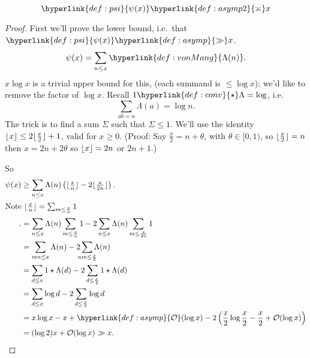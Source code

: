 \documentclass{article}
\newcommand{\1}{\mathbbm{1}}
\newcommand{\bigO}{\mathcal{O}}
\DeclarePairedDelimiter\floor{\lfloor}{\rfloor}
\begin{document}
\begin{nthm}[Chebyshev]\label{thm:6}
  \begin{equation*}
    \hyperlink{def:psi}{\psi(x)} \hyperlink{def:asymp2}{\asymp} x
  \end{equation*}
\end{nthm}
\begin{proof}
  First we'll prove the lower bound, i.e.\ that $\hyperlink{def:psi}{\psi(x)} \hyperlink{def:asymp}{\gg} x$.
  \begin{equation*}
    \psi(x) = \sum_{n \leq x} \hyperlink{def:vonMang}{\Lambda(n)}.
  \end{equation*}
  $x \log x$ is a trivial upper bound for this, (each summand is $\leq \log x$); we'd like to remove the factor of $\log x$.
  Recall $1 \hyperlink{def:conv}{\star} \Lambda = \log$, i.e.\
  \begin{equation*}\sum_{ab=n} \Lambda(a) = \log n.\end{equation*}
  The trick is to find a sum $\Sigma$ such that $\Sigma \leq 1$.
  We'll use the identity $\floor{x} \leq 2 \floor{\frac{x}{2}} + 1$, valid for $x \geq 0$.
  (Proof: Say $\frac{x}{2} = n + \theta$, with $\theta \in [0,1)$, so $\floor{\frac{x}{2}} = n$ then $x = 2n + 2\theta$ so $\floor{x} = 2n$ or $2n+1$.)

  So
  \begin{align*}
    \psi(x) &\geq \sum_{n \leq x} \Lambda(n) \left(\floor{\tfrac{x}{n}} - 2 \floor{\tfrac{x}{2n}}\right). \\
    \shortintertext{Note $\floor{\frac{x}{n}} = \sum_{m \leq \frac{x}{n}} 1$}.
            &= \sum_{n \leq x} \Lambda(n) \sum_{m \leq \frac xn} 1 - 2 \sum_{n \leq x} \Lambda(n) \sum_{m \leq \frac x {2n}} 1 \\
            &= \sum_{mn \leq x} \Lambda(n) - 2 \sum_{\mathclap{nm \leq \frac x2}} \Lambda(n) \\
            &= \sum_{d \leq x} 1 \star \Lambda(d) - 2 \sum_{d \leq \frac x2} 1 \star \Lambda(d) \\
            &= \sum_{d \leq x} \log d - 2 \sum_{d \leq \frac{x}{2}} \log d \\
            &= x \log x - x + \hyperlink{def:asymp}{\bigO}(\log x) - 2 \left(\frac{x}{2} \log \frac{x}{2} - \frac{x}{2} + \bigO(\log x)\right) \\
            &= (\log 2) x + \bigO(\log x) \gg x.
  \end{align*}


\end{proof}
\end{document}
